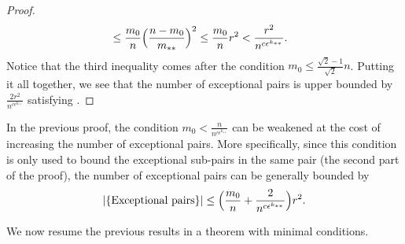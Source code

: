 \begin{lemma}
\begin{proof}
\[\begin{split}
                            & \leq \frac{m_0}{n} \Bigl( \frac{n - m_0}{m_{**}} \Bigr)^2
                                \leq \frac{m_0}{n} r^2
                                < \frac{r^2}{n^{c \epsilon^{k_{**}}}}.
                    \end{split}
                \]
                Notice that the third inequality comes after the condition $m_0 \leq \frac{\sqrt{2}-1}{\sqrt{2}} n$.
                Putting it all together, we see that the number of exceptional pairs is upper bounded by
                    $\frac{2r^2}{n^{c\epsilon^{k_{**}}}}$ satisfying .
            \end{proof}
        \end{lemma}

        \begin{remark}
            In the previous proof, the condition $m_0 < \frac{n}{n^{c\epsilon^{k_{**}}}}$ can be
            weakened at the cost of increasing the number of exceptional pairs.
            More specifically, since this condition is only used to bound the exceptional sub-pairs in the same pair
            (the second part of the proof), the number of exceptional pairs can be generally bounded by
            \[
                |\{ \text{Exceptional pairs} \}|
                    \leq \Bigl( \frac{m_0}{n} + \frac{2}{n^{c\epsilon^{k_{**}}}} \Bigr) r^2.
            \]
        \end{remark}

        We now resume the previous results in a theorem with minimal conditions.

